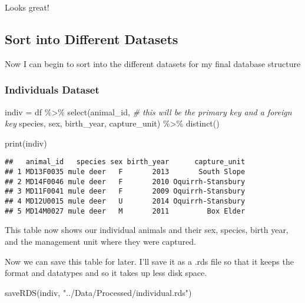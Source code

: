 \documentclass[
]{book}
\newenvironment{Shaded}{\begin{snugshade}}{\end{snugshade}}
\newcommand{\CommentTok}[1]{\textcolor[rgb]{0.56,0.35,0.01}{\textit{#1}}}
\newcommand{\FunctionTok}[1]{\textcolor[rgb]{0.00,0.00,0.00}{#1}}
\newcommand{\NormalTok}[1]{#1}
\newcommand{\OtherTok}[1]{\textcolor[rgb]{0.56,0.35,0.01}{#1}}
\newcommand{\SpecialCharTok}[1]{\textcolor[rgb]{0.00,0.00,0.00}{#1}}
\newcommand{\StringTok}[1]{\textcolor[rgb]{0.31,0.60,0.02}{#1}}
\begin{document}
Looks great!

\hypertarget{sort-into-different-datasets}{%
\subsection{Sort into Different Datasets}\label{sort-into-different-datasets}}

Now I can begin to sort into the different datasets for my final database structure

\hypertarget{individuals-dataset}{%
\subsubsection{Individuals Dataset}\label{individuals-dataset}}

\begin{Shaded}
\begin{Highlighting}[]
\NormalTok{indiv }\OtherTok{=}\NormalTok{ df }\SpecialCharTok{\%\textgreater{}\%}
  \FunctionTok{select}\NormalTok{(animal\_id, }\CommentTok{\# this will be the primary key and a foreign key}
\NormalTok{         species,}
\NormalTok{         sex,}
\NormalTok{         birth\_year,}
\NormalTok{         capture\_unit) }\SpecialCharTok{\%\textgreater{}\%}
  \FunctionTok{distinct}\NormalTok{()}

\FunctionTok{print}\NormalTok{(indiv)}
\end{Highlighting}
\end{Shaded}

\begin{verbatim}
##   animal_id   species sex birth_year      capture_unit
## 1 MD13F0035 mule deer   F       2013       South Slope
## 2 MD14F0046 mule deer   F       2010 Oquirrh-Stansbury
## 3 MD11F0041 mule deer   F       2009 Oquirrh-Stansbury
## 4 MD12U0015 mule deer   U       2014 Oquirrh-Stansbury
## 5 MD14M0027 mule deer   M       2011         Box Elder
\end{verbatim}

This table now shows our individual animals and their sex, species, birth year, and the management unit where they were captured.

Now we can save this table for later. I'll save it as a .rds file so that it keeps the format and datatypes and so it takes up less disk space.

\begin{Shaded}
\begin{Highlighting}[]
\FunctionTok{saveRDS}\NormalTok{(indiv, }\StringTok{"../Data/Processed/individual.rds"}\NormalTok{)}
\end{Highlighting}
\end{Shaded}
\end{document}
